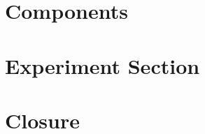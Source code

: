 \chapter{Components} \label{c:Components}				%

\chapter{Experiment Section}\label{c:Implementation}	%





\chapter{Closure} \label{c:Closure}			


\appendix
\printindex					%
\listoffigures				%
\printbibliography[			%
	heading=bibintoc,
	title={Bibliography}]
	
